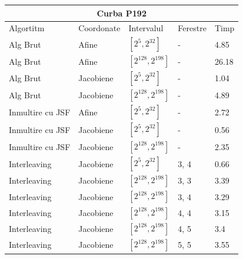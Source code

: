 \begin{tabular}{ |p{5cm}||p{3cm}|p{3cm}|p{2cm}|p{1cm}|  }
 \hline
 \multicolumn{5}{|c|}{Curba P192} \\
 \hline
  Algortitm& Coordonate &Intervalul &Ferestre &Timp\\
 \hline
 Alg Brut & Afine  &$[2^{5},2^{32}]$& - & 4.85\\
 Alg Brut & Afine  &$[2^{128},2^{198}]$& - & 26.18 \\
 Alg Brut & Jacobiene  &$[2^{5},2^{32}]$& - & 1.04 \\
 Alg Brut & Jacobiene  &$[2^{128},2^{198}]$& - & 4.89 \\
 Inmultire cu JSF & Afine  &$[2^{5},2^{32}]$& - & 2.72 \\
 Inmultire cu JSF & Jacobiene  &$[2^{5},2^{32}]$& - & 0.56 \\
 Inmultire cu JSF & Jacobiene  &$[2^{128},2^{198}]$& - & 2.35 \\
 Interleaving & Jacobiene  &$[2^{5},2^{32}]$& 3, 4 & 0.66 \\
 Interleaving & Jacobiene  &$[2^{128},2^{198}]$& 3, 3 & 3.39\\
 Interleaving & Jacobiene  &$[2^{128},2^{198}]$& 3, 4 &  3.29\\
 Interleaving & Jacobiene  &$[2^{128},2^{198}]$& 4, 4 & 3.15 \\
 Interleaving & Jacobiene  &$[2^{128},2^{198}]$& 4, 5 & 3.4 \\
 Interleaving & Jacobiene  &$[2^{128},2^{198}]$& 5, 5 & 3.55 \\
 \hline
\end{tabular}

